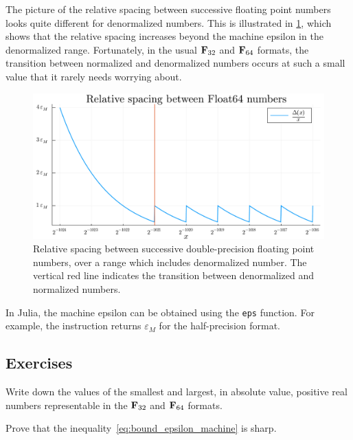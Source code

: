 The picture of the relative spacing between successive floating point numbers looks quite different for denormalized numbers.
This is illustrated in \cref{fig:float64_spacing_denormalized},
which shows that the relative spacing increases beyond the machine epsilon in the denormalized range.
Fortunately, in the usual $\mathbf F_{32}$ and $\mathbf F_{64}$ formats,
the transition between normalized and denormalized numbers occurs at such a small value that
it rarely needs worrying about.

\begin{figure}[ht]
    \centering
    \includegraphics[width=.8\textwidth]{figures/float64_spacing_denormalized.pdf}
    \caption{%
        Relative spacing between successive double-precision floating point numbers,
        over a range which includes denormalized number.
        The vertical red line indicates the transition between denormalized and normalized numbers.
    }%
    \label{fig:float64_spacing_denormalized}
\end{figure}

\begin{remark}
    In Julia,
    the machine epsilon can be obtained using the \texttt{eps} function.
    For example, the instruction  returns $\varepsilon_M$ for the half-precision format.
\end{remark}

\subsection{Exercises}%
\label{sub:exercises}

\begin{exercise}
    Write down the values of the smallest and largest, in absolute value,
    positive real numbers representable in the $\mathbf F_{32}$ and $\mathbf F_{64}$ formats.
\end{exercise}

\begin{exercise}
    \label{exercise:machine_epsilon}
    Prove that the inequality~\eqref{eq:bound_epsilon_machine} is sharp.
\end{exercise}

